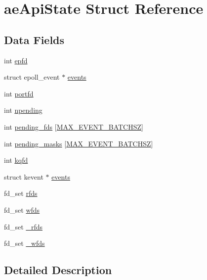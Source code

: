\hypertarget{structae_api_state}{}\section{ae\+Api\+State Struct Reference}
\label{structae_api_state}
\subsection*{Data Fields}
\begin{DoxyCompactItemize}
\item 
int \hyperlink{structae_api_state_ad9ea3108c3907d7dedaf4ee7283bef1d}{epfd}
\item 
struct epoll\+\_\+event $\ast$ \hyperlink{structae_api_state_a18bcd14e4d4cab5184d3b046754cd248}{events}
\item 
int \hyperlink{structae_api_state_aa9eafa913479690a5a1dd276dda1e270}{portfd}
\item 
int \hyperlink{structae_api_state_a6f4c81b06defc657dcf060888fa72ad2}{npending}
\item 
int \hyperlink{structae_api_state_adffd92b7629bbcebdbf55f077e1df317}{pending\+\_\+fds} \mbox{[}\hyperlink{ae__evport_8c_ab9854fb7f580a9077208ed70f45c8f15}{M\+A\+X\+\_\+\+E\+V\+E\+N\+T\+\_\+\+B\+A\+T\+C\+H\+SZ}\mbox{]}
\item 
int \hyperlink{structae_api_state_a60c7db13c66fbee7d2107c9dbe05acbe}{pending\+\_\+masks} \mbox{[}\hyperlink{ae__evport_8c_ab9854fb7f580a9077208ed70f45c8f15}{M\+A\+X\+\_\+\+E\+V\+E\+N\+T\+\_\+\+B\+A\+T\+C\+H\+SZ}\mbox{]}
\item 
int \hyperlink{structae_api_state_aa16ac46da03ffb75e8913e2b978ad813}{kqfd}
\item 
struct kevent $\ast$ \hyperlink{structae_api_state_ac4b7894707b47b577951136ff0c44929}{events}
\item 
fd\+\_\+set \hyperlink{structae_api_state_a66342c63e01fe543ed20793f32385f7e}{rfds}
\item 
fd\+\_\+set \hyperlink{structae_api_state_a6391a90ddf873c2555b842a474fb9309}{wfds}
\item 
fd\+\_\+set \hyperlink{structae_api_state_a0e84e684034812e7fd687c23ccf3019a}{\+\_\+rfds}
\item 
fd\+\_\+set \hyperlink{structae_api_state_a244aead6b00af6366ffb8ca8f49fdcd5}{\+\_\+wfds}
\end{DoxyCompactItemize}


\subsection{Detailed Description}



